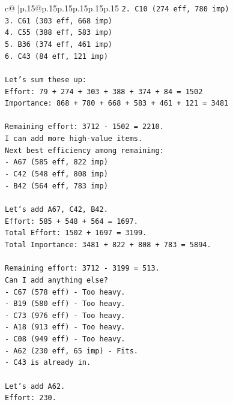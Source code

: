 \documentclass{article}
\begin{document}
{\begin{supertabular}{c@{$\;$}|p{.15\linewidth}@{}p{.15\linewidth}p{.15\linewidth}p{.15\linewidth}p{.15\linewidth}p{.15\linewidth}}
{{{\texttt{2. C10 (274 eff, 780 imp)} \\
\texttt{3. C61 (303 eff, 668 imp)} \\
\texttt{4. C55 (388 eff, 583 imp)} \\
\texttt{5. B36 (374 eff, 461 imp)} \\
\texttt{6. C43 (84 eff, 121 imp)} \\
\\ 
\texttt{Let's sum these up:} \\
\texttt{Effort: 79 + 274 + 303 + 388 + 374 + 84 = 1502} \\
\texttt{Importance: 868 + 780 + 668 + 583 + 461 + 121 = 3481} \\
\\ 
\texttt{Remaining effort: 3712 {-} 1502 = 2210.} \\
\texttt{I can add more high{-}value items.} \\
\texttt{Next best efficiency among remaining:} \\
\texttt{{-} A67 (585 eff, 822 imp)} \\
\texttt{{-} C42 (548 eff, 808 imp)} \\
\texttt{{-} B42 (564 eff, 783 imp)} \\
\\ 
\texttt{Let's add A67, C42, B42.} \\
\texttt{Effort: 585 + 548 + 564 = 1697.} \\
\texttt{Total Effort: 1502 + 1697 = 3199.} \\
\texttt{Total Importance: 3481 + 822 + 808 + 783 = 5894.} \\
\\ 
\texttt{Remaining effort: 3712 {-} 3199 = 513.} \\
\texttt{Can I add anything else?} \\
\texttt{{-} C67 (578 eff) {-} Too heavy.} \\
\texttt{{-} B19 (580 eff) {-} Too heavy.} \\
\texttt{{-} C73 (976 eff) {-} Too heavy.} \\
\texttt{{-} A18 (913 eff) {-} Too heavy.} \\
\texttt{{-} C08 (949 eff) {-} Too heavy.} \\
\texttt{{-} A62 (230 eff, 65 imp) {-} Fits.} \\
\texttt{{-} C43 is already in.} \\
\\ 
\texttt{Let's add A62.} \\
\texttt{Effort: 230.} \\
}}}
\end{supertabular}}
\end{document}
